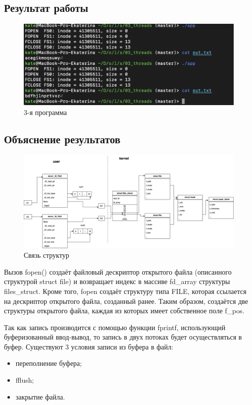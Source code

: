 \documentclass[12pt]{report}
\begin{document}
\subsection*{Результат работы}
\begin{figure}[H]
	\centering
	\includegraphics[scale=1]{res_03.png}
	\caption{3-я программа}
	\label{fig:1}
\end{figure}
\subsection*{Объяснение результатов}
\begin{figure}[H]
	\centering
	\includegraphics[scale=0.37]{os_lab_05-3.jpg}
	\caption{Связь структур}
	\label{fig:1}
\end{figure}
Вызов fopen() создаёт файловый дескриптор открытого файла (описанного структурой struct file) и возвращает индекс в массиве fd\_array структуры files\_struct. Кроме того, fopen создаёт структуру типа FILE, которая ссылается на дескриптор открытого файла, созданный ранее. Таким образом, создаётся две структуры открытого файла, каждая из которых имеет собственное поле f\_pos. 

Так как запись производится с помощью функции fprintf, использующий буферизованный ввод-вывод, то запись в двух потоках будет осуществляться в буфер. Существуют 3 условия записи из буфера в файл:
\begin{itemize}
    \item переполнение буфера;
    \item fflush;
    \item закрытие файла.
\end{itemize}
\end{document}

